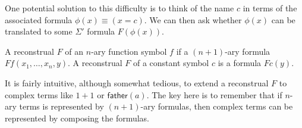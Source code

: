  One potential solution to this difficulty is to think of the name $c$
 in terms of the associated formula $\phi (x)\equiv (x=c)$.  We can
 then ask whether $\phi (x)$ can be translated to some $\Sigma '$
 formula $F(\phi (x))$.





\begin{defn} A reconstrual $F$ of an $n$-ary function symbol $f$ if a
  $(n+1)$-ary formula $Ff(x_1,\dots ,x_n,y)$.  A reconstrual $F$ of a
  constant symbol $c$ is a formula $Fc(y)$.  \end{defn}

It is fairly intuitive, although somewhat tedious, to extend a
reconstrual $F$ to complex terms like $1+1$ or $\mathsf{father}(a)$.
The key here is to remember that if $n$-ary terms is represented by
$(n+1)$-ary formulas, then complex terms can be represented by
composing the formulas.


